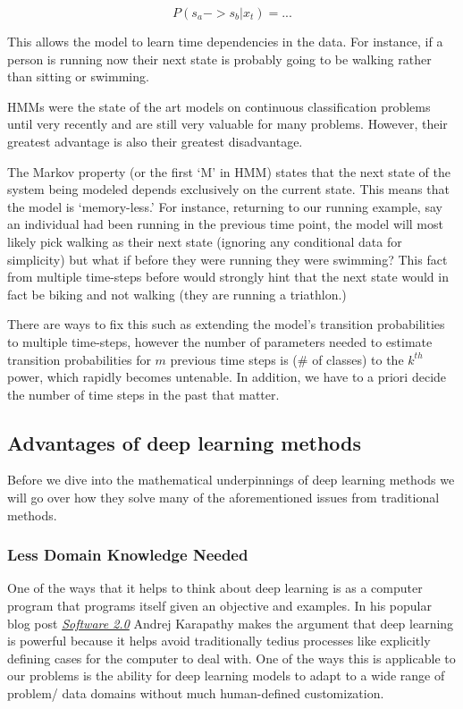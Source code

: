 \documentclass[]{book}
\theoremstyle{definition}
\theoremstyle{definition}
\theoremstyle{definition}
\theoremstyle{remark}
\begin{document}
\[P(s_a -> s_b | x_t) = ...\]

This allows the model to learn time dependencies in the data. For
instance, if a person is running now their next state is probably going
to be walking rather than sitting or swimming.

HMMs were the state of the art models on continuous classification
problems until very recently and are still very valuable for many
problems. However, their greatest advantage is also their greatest
disadvantage.

The Markov property (or the first `M' in HMM) states that the next state
of the system being modeled depends exclusively on the current state.
This means that the model is `memory-less.' For instance, returning to
our running example, say an individual had been running in the previous
time point, the model will most likely pick walking as their next state
(ignoring any conditional data for simplicity) but what if before they
were running they were swimming? This fact from multiple time-steps
before would strongly hint that the next state would in fact be biking
and not walking (they are running a triathlon.)

There are ways to fix this such as extending the model's transition
probabilities to multiple time-steps, however the number of parameters
needed to estimate transition probabilities for \(m\) previous time
steps is (\# of classes) to the \(k^{th}\) power, which rapidly becomes
untenable. In addition, we have to a priori decide the number of time
steps in the past that matter.

\subsection{Advantages of deep learning
methods}\label{advantages-of-deep-learning-methods}

Before we dive into the mathematical underpinnings of deep learning
methods we will go over how they solve many of the aforementioned issues
from traditional methods.

\subsubsection{Less Domain Knowledge
Needed}\label{less-domain-knowledge-needed}

One of the ways that it helps to think about deep learning is as a
computer program that programs itself given an objective and examples.
In his popular blog post
\href{https://medium.com/@karpathy/software-2-0-a64152b37c35}{\emph{Software
2.0}} Andrej Karapathy makes the argument that deep learning is powerful
because it helps avoid traditionally tedius processes like explicitly
defining cases for the computer to deal with. One of the ways this is
applicable to our problems is the ability for deep learning models to
adapt to a wide range of problem/ data domains without much
human-defined customization.
\end{document}
